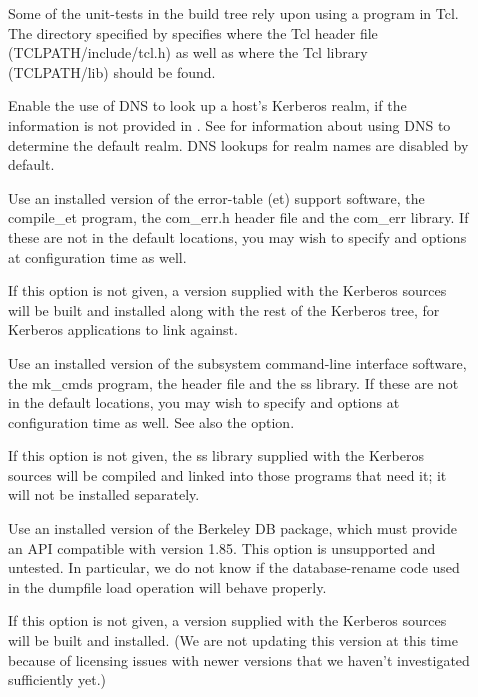 \documentclass[letterpaper,10pt,english]{sphinxmanual}
\begin{document}
\begin{description}
\item[{\sphinxstylestrong{-}}] \leavevmode
Some of the unit-tests in the build tree rely upon using a program
in Tcl.  The directory specified by  specifies where the
Tcl header file (TCLPATH/include/tcl.h) as well as where the Tcl
library (TCLPATH/lib) should be found.

\item[{\sphinxstylestrong{-}}] \leavevmode
Enable the use of DNS to look up a host’s Kerberos realm,
if the information is not provided in
.  See 
for information about using DNS to determine the default realm.
DNS lookups for realm names are disabled by default.

\item[{\sphinxstylestrong{-}}] \leavevmode
Use an installed version of the error-table (et) support software,
the compile\_et program, the com\_err.h header file and the com\_err
library.  If these are not in the default locations, you may wish
to specify  and
 options at configuration time as
well.

If this option is not given, a version supplied with the Kerberos
sources will be built and installed along with the rest of the
Kerberos tree, for Kerberos applications to link against.

\item[{\sphinxstylestrong{-}}] \leavevmode
Use an installed version of the subsystem command-line interface
software, the mk\_cmds program, the  header file and the
ss library.  If these are not in the default locations, you may
wish to specify  and
 options at configuration time as
well.  See also the  option.

If this option is not given, the ss library supplied with the
Kerberos sources will be compiled and linked into those programs
that need it; it will not be installed separately.

\item[{\sphinxstylestrong{-}}] \leavevmode
Use an installed version of the Berkeley DB package, which must
provide an API compatible with version 1.85.  This option is
unsupported and untested.  In particular, we do not know if the
database-rename code used in the dumpfile load operation will
behave properly.

If this option is not given, a version supplied with the Kerberos
sources will be built and installed.  (We are not updating this
version at this time because of licensing issues with newer
versions that we haven’t investigated sufficiently yet.)

\end{description}
\end{document}
